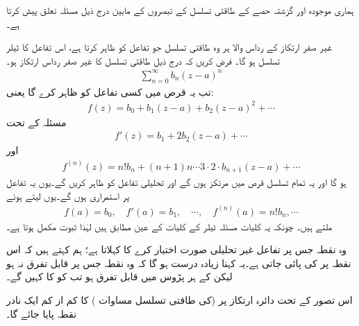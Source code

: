 ہماری موجودہ اور گزشتہ حصے کے  طاقتی تسلسل کے تبصروں کے مابین درج ذیل مسئلہ تعلق پیش کرتا ہے۔

غیر صفر ارتکاز کے رداس والا ہر وہ طاقتی تسلسل جو تفاعل کو ظاہر کرتا ہے، اس تفاعل کا ٹیلر تسلسل ہو گا۔ 
\quad
فرض کریں کہ درج ذیل طاقتی تسلسل کا غیر صفر رداس ارتکاز  ہو۔
\begin{align*}
\sum\limits_{n=0}^{\infty}b_n(z-a)^n
\end{align*}
تب یہ قرص  میں کسی تفاعل  کو ظاہر کرے گا یعنی:
\begin{align*}
f(z)=b_0+b_1(z-a)+b_2(z-a)^2+\cdots
\end{align*}
مسئلہ  کے تحت
\begin{align*}
f'(z)=b_1+2b_2(z-a)+\cdots
\end{align*}
اور
\begin{align*}
f^{(n)}(z)=n!b_n+(n+1)n\cdots 3\cdot 2\cdot b_{n+1}(z-a)+\cdots
\end{align*}
ہو گا اور یہ تمام تسلسل قرص  میں مرتکز ہوں گے اور تحلیلی تفاعل کو ظاہر کریں گے۔یوں یہ تفاعل  پر استمراری  ہوں گے۔یوں  لیتے ہوئے 
\begin{align*}
f(a)=b_0,\quad f'(a)=b_1,\quad \cdots,\quad f^{(n)}(a)=n!b_n,\cdots
\end{align*}
ملتے ہیں۔ چونکہ یہ کلیات مسئلہ ٹیلر  کے کلیات کے  عین مطابق ہیں لہٰذا ثبوت مکمل ہوتا ہے۔

وہ نقطہ جس پر تفاعل  غیر تحلیلی صورت اختیار کرے  کا  کہلاتا ہے؛ ہم کہتے ہیں کہ اس نقطہ پر  کی  پائی جاتی ہے۔یہ کہنا زیادہ درست ہو گا کہ وہ نقطہ  جس پر  قابل تفرق نہ ہو لیکن  کے ہر پڑوس میں  قابل تفرق ہو تب  کو  کا  کہیں گے۔ 

اس تصور کے تحت دائرہ ارتکاز پر  (کی طاقتی تسلسل مساوات ) کا کم از کم ایک نادر نقطہ پایا جائے گا۔ 

